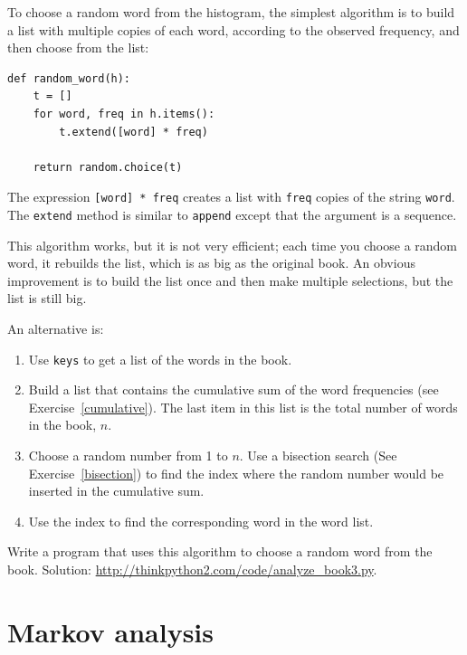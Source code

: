 \documentclass[10pt]{book}
\begin{document}
To choose a random word from the histogram, the simplest algorithm
is to build a list with multiple copies of each word, according
to the observed frequency, and then choose from the list:

\begin{verbatim}
def random_word(h):
    t = []
    for word, freq in h.items():
        t.extend([word] * freq)

    return random.choice(t)
\end{verbatim}
%
The expression {\tt [word] * freq} creates a list with {\tt freq}
copies of the string {\tt word}.  The {\tt extend}
method is similar to {\tt append} except that the argument is
a sequence.

This algorithm works, but it is not very efficient; each time you
choose a random word, it rebuilds the list, which is as big as
the original book.  An obvious improvement is to build the list
once and then make multiple selections, but the list is still big.

An alternative is:

\begin{enumerate}

\item Use {\tt keys} to get a list of the words in the book.

\item Build a list that contains the cumulative sum of the word
  frequencies (see Exercise~\ref{cumulative}).  The last item
  in this list is the total number of words in the book, $n$.
  
\item Choose a random number from 1 to $n$.  Use a bisection search
  (See Exercise~\ref{bisection}) to find the index where the random
  number would be inserted in the cumulative sum.

\item Use the index to find the corresponding word in the word list.

\end{enumerate}

\begin{exercise}
\label{randhist}

Write a program that uses this algorithm to choose a random word from
the book.  Solution:
\url{http://thinkpython2.com/code/analyze_book3.py}.

\end{exercise}



\section{Markov analysis}
\label{markov}
\end{document}

